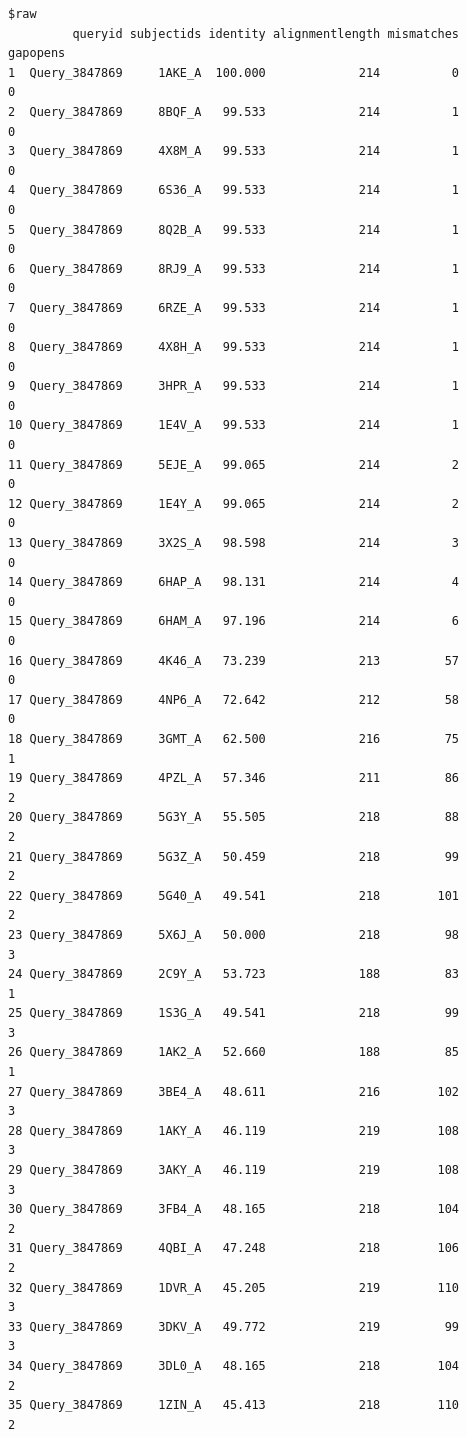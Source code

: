 \documentclass[
  letterpaper,
  DIV=11,
  numbers=noendperiod]{scrartcl}
\begin{document}
\begin{verbatim}
$raw
         queryid subjectids identity alignmentlength mismatches gapopens
1  Query_3847869     1AKE_A  100.000             214          0        0
2  Query_3847869     8BQF_A   99.533             214          1        0
3  Query_3847869     4X8M_A   99.533             214          1        0
4  Query_3847869     6S36_A   99.533             214          1        0
5  Query_3847869     8Q2B_A   99.533             214          1        0
6  Query_3847869     8RJ9_A   99.533             214          1        0
7  Query_3847869     6RZE_A   99.533             214          1        0
8  Query_3847869     4X8H_A   99.533             214          1        0
9  Query_3847869     3HPR_A   99.533             214          1        0
10 Query_3847869     1E4V_A   99.533             214          1        0
11 Query_3847869     5EJE_A   99.065             214          2        0
12 Query_3847869     1E4Y_A   99.065             214          2        0
13 Query_3847869     3X2S_A   98.598             214          3        0
14 Query_3847869     6HAP_A   98.131             214          4        0
15 Query_3847869     6HAM_A   97.196             214          6        0
16 Query_3847869     4K46_A   73.239             213         57        0
17 Query_3847869     4NP6_A   72.642             212         58        0
18 Query_3847869     3GMT_A   62.500             216         75        1
19 Query_3847869     4PZL_A   57.346             211         86        2
20 Query_3847869     5G3Y_A   55.505             218         88        2
21 Query_3847869     5G3Z_A   50.459             218         99        2
22 Query_3847869     5G40_A   49.541             218        101        2
23 Query_3847869     5X6J_A   50.000             218         98        3
24 Query_3847869     2C9Y_A   53.723             188         83        1
25 Query_3847869     1S3G_A   49.541             218         99        3
26 Query_3847869     1AK2_A   52.660             188         85        1
27 Query_3847869     3BE4_A   48.611             216        102        3
28 Query_3847869     1AKY_A   46.119             219        108        3
29 Query_3847869     3AKY_A   46.119             219        108        3
30 Query_3847869     3FB4_A   48.165             218        104        2
31 Query_3847869     4QBI_A   47.248             218        106        2
32 Query_3847869     1DVR_A   45.205             219        110        3
33 Query_3847869     3DKV_A   49.772             219         99        3
34 Query_3847869     3DL0_A   48.165             218        104        2
35 Query_3847869     1ZIN_A   45.413             218        110        2

\end{verbatim}
\end{document}
